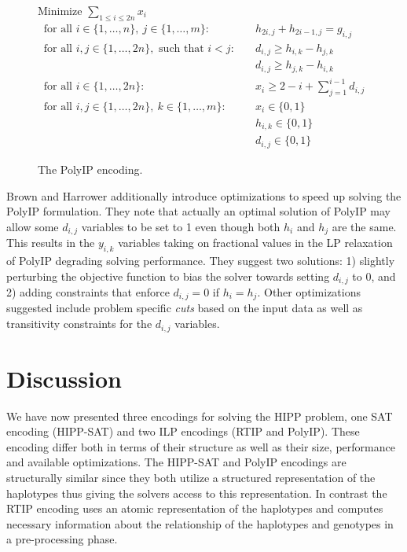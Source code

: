 \documentclass[12pt,a4paper]{article}
\begin{document}
\begin{figure}
\begin{mdframed}
\centering
Minimize $\sum_{1\leq i \leq 2n} x_i$
\begin{align}
\text{for all  }i\in\{1,\dots , n\},\ j\in\{1,\dots ,m\}:&\quad h_{2i,j} + h_{2i-1,j} = g_{i,j} \\
\text{for all  }i, j\in\{1,\dots , 2n\},\text{ such that } i<j:&\quad d_{i,j} \geq h_{i,k}-h_{j,k} \\
&\quad d_{i,j} \geq h_{j,k}-h_{i,k} \\
\text{for all  }i\in\{1,\dots , 2n\}:&\quad x_{i} \geq 2 - i +  \sum_{j=1}^{i-1} d_{i,j} \\
\text{for all  }i,j\in\{1,\dots , 2n\},\ k\in\{1,\dots ,m\}:&\quad x_i\in\{0,1\} \\
&\quad h_{i,k}\in\{0,1\} \\
&\quad d_{i,j}\in\{0,1\}
\end{align}
\end{mdframed}
\caption{The PolyIP encoding.}
\label{fig:enc-polyip}
\end{figure}

Brown and Harrower additionally introduce optimizations to speed up solving the PolyIP formulation.
They note that actually an optimal solution of PolyIP may allow some $d_{i,j}$ variables to be set to 1 even though both $h_i$ and $h_j$ are the same.  
This results in the $y_{i,k}$ variables taking on fractional values in the LP relaxation of PolyIP degrading solving performance.
They suggest two solutions: 1) slightly perturbing the objective function to bias the solver towards setting $d_{i,j}$ to 0, 
and 2) adding constraints that enforce $d_{i,j}=0$ if $h_i=h_j$.
Other optimizations suggested include problem specific \emph{cuts} based on the input data as well as transitivity constraints for the $d_{i,j}$ variables.

\section{Discussion}

We have now presented three encodings for solving the HIPP problem, one SAT encoding (HIPP-SAT) and two ILP encodings (RTIP and PolyIP).
These encoding differ both in terms of their structure as well as their size, performance and available optimizations.
The HIPP-SAT and PolyIP encodings are structurally similar since they both utilize a structured representation of the haplotypes thus giving the solvers access to this representation.
In contrast the RTIP encoding uses an atomic representation of the haplotypes and computes necessary information about the relationship of the haplotypes and genotypes in a pre-processing phase.
\end{document}
